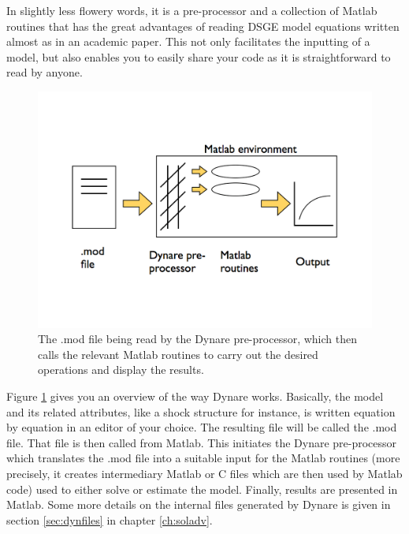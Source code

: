 \documentclass[10pt,math=newtx,citestyle=gb7714-2015,bibstyle=gb7714-2015]{elegantbook}
\begin{document}
	In slightly less flowery words, it is a pre-processor and a collection of Matlab routines that has the great advantages of reading DSGE model equations written almost as in an academic paper. This not only facilitates the inputting of a model, but also enables you to easily share your code as it is straightforward to read by anyone.\\
	\begin{figure} \label{fig:dyn}
		\begin{center}
			\includegraphics[width=1.0\textwidth]{P_DynareStruct2}
		\end{center}
		\caption[Dynare, a bird's eyeview]{The .mod file being read by the Dynare pre-processor, which then calls the relevant Matlab routines to carry out the desired operations and display the results.}
	\end{figure}
	
	Figure \ref{fig:dyn} gives you an overview of the way Dynare works. Basically, the model and its related attributes, like a shock structure for instance, is written equation by equation in an editor of your choice. The resulting file will be called the .mod file. That file is then called from Matlab. This initiates the Dynare pre-processor which translates the .mod file into a suitable input for the Matlab routines (more precisely, it creates intermediary Matlab or C files which are then used by Matlab code) used to either solve or estimate the model. Finally, results are presented in Matlab. Some more details on the internal files generated by Dynare is given in section \ref{sec:dynfiles} in chapter \ref{ch:soladv}. 
	
\end{document}
